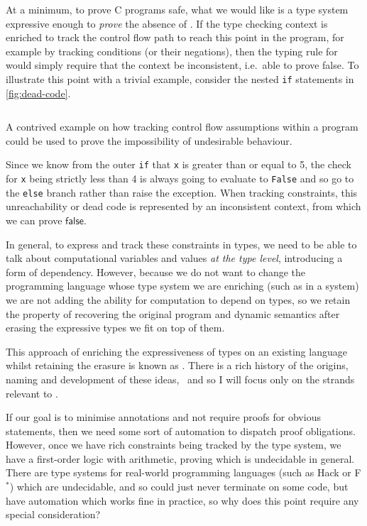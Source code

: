 At a minimum, to prove C programs safe, what we would like is a type system
expressive enough to \emph{prove} the absence of . If the type checking
context is enriched to track the control flow path to reach this point in the
program, for example by tracking conditions (or their negations), then the
typing rule for  would simply require that the context %
be inconsistent, i.e.\ able to prove false. To illustrate this point with
a trivial example, consider the nested \texttt{if} statements in
\cref{fig:dead-code}.

\begin{marginfigure}
    \inputminted[breaklines,mathescape,fontsize=\small]{py}{code/dead_code.py}
    \caption{A contrived example on how tracking control flow assumptions
        within a program could be used to prove the impossibility of
        undesirable behaviour.}\label{fig:dead-code}
\end{marginfigure}

Since we know from the outer \texttt{if} that \texttt{x} is
greater than or equal to 5, the check for \texttt{x} being strictly
less than 4 is always going to evaluate to \texttt{False} and so go to
the \texttt{else} branch rather than raise the exception. When tracking
constraints, this unreachability or dead code is represented by an inconsistent
context, from which we can prove $\mathsf{false}$.

In general, to express and track these constraints in types, we need to be able
to talk about computational variables and values \emph{at the type level},
introducing a form of dependency. However, because we do not want to change the
programming language whose type system we are enriching (such as in a
 system) we are not adding the ability for computation to
depend on types, so we retain the property of recovering the original program
and dynamic semantics after erasing the expressive types we fit on top of them.

This approach of enriching the expressiveness of types on an existing language
whilst retaining the erasure is known as . There is a
rich history of the origins, naming and development of these
ideas,~ and so I will focus only on the strands
relevant to .

If our goal is to minimise annotations and not require proofs for obvious
statements, then we need some sort of automation to dispatch proof
obligations. However, once we have rich constraints being tracked by the type
system, we have a first-order logic with arithmetic, proving which is
undecidable in general. There are type systems for real-world
programming languages (such as Hack or F$^*$) which are undecidable, and so
could just never terminate on some code, but have automation which works fine
in practice, so why does this point require any special consideration?

